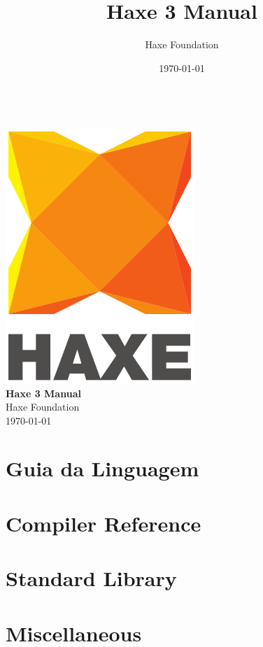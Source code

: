 \documentclass{../haxe}
\renewcommand{\maketitle}{
   \begin{titlepage}
     \setcounter{page}{-1}
			\begin{center}
				~\\[3cm]
				\includegraphics[scale=1.25]{assets/logo.pdf}~\\[1cm]
				{\huge \bfseries Haxe 3 Manual}\\[7cm]
				Haxe Foundation\\
				\today
			\end{center}
   \end{titlepage}
}
\begin{document}
\title{Haxe 3 Manual}
\author{Haxe Foundation}
\date{\today}
\maketitle


\clearpage
\todototoc
\listoftodos
\clearpage

\clearpage
\tableofcontents
\clearpage



\part{Guia da Linguagem}

% 
% 
% 
% 

\part{Compiler Reference}
% 
% 
% 

\part{Standard Library}
% 

\part{Miscellaneous}
% 
% 
\end{document}
